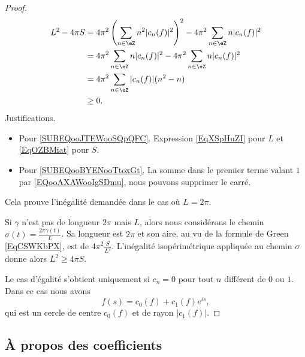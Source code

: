 \begin{proof}
	\begin{subequations}
		\begin{align}
			L^2-4\pi S & =4\pi^2\left( \sum_{n\in \eZ}n^2| c_n(f) |^2 \right)^2-4\pi^2\sum_{n\in \eZ}n| c_n(f) |^2       \label{SUBEQooJTEWooSQpQFC} \\
			           & =4\pi^2\sum_{n\in \eZ}n| c_n(f) |^2-4\pi^2\sum_{n\in \eZ}n| c_n(f) |^2      \label{SUBEQooBYENooTtoxGt}                     \\
			           & =4\pi^2\sum_{n\in \eZ}| c_n(f) |(n^2-n)                                                                                     \\
			           & \geq 0.
		\end{align}
	\end{subequations}
	Justifications.
	\begin{itemize}
		\item Pour \eqref{SUBEQooJTEWooSQpQFC}. Expression \eqref{EqXSpHuZI} pour \( L\) et \eqref{EqOZBMiat} pour \( S\).
		\item Pour \eqref{SUBEQooBYENooTtoxGt}. La somme dans le premier terme valant \( 1\) par \eqref{EQooAXAWooIgSDmu}, nous pouvons supprimer le carré.
	\end{itemize}
	Cela prouve l'inégalité demandée dans le cas où \( L=2\pi\).

	Si \( \gamma\) n'est pas de longueur \( 2\pi\) mais \( L\), alors nous considérons le chemin \( \sigma(t)=\frac{ 2\pi\gamma(t) }{ L }\). Sa longueur est \( 2\pi\) et son aire, au vu de la formule de Green \eqref{EqCSWKbPX}, est de \( 4\pi^2\frac{ S }{ L^2 }\). L'inégalité isopérimétrique appliquée au chemin \( \sigma\) donne alors \( L^2\geq 4\pi S\).

	Le cas d'égalité s'obtient uniquement si \( c_n=0\) pour tout \( n\) différent de \( 0\) ou \( 1\). Dans ce cas nous avons
	\begin{equation}
		f(s)=c_0(f)+c_1(f) e^{is},
	\end{equation}
	qui est un cercle de centre \( c_0(f)\) et de rayon \( | c_1(f) |\).
\end{proof}

\subsection{À propos des coefficients}

